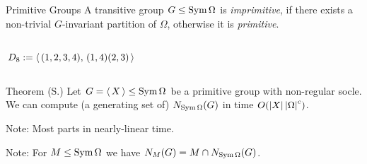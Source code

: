\documentclass{beamer}
\theoremstyle{plain}
\theoremstyle{definition}
\begin{document}
\begin{frame}{Primitive Groups}
A transitive group $G \leq \operatorname{Sym} \Omega$ is
\emph{imprimitive}, if there exists a non-trivial $G$-invariant partition of
$\Omega$,
otherwise it is \emph{primitive}.

\begin{columns}
\begin{column}{0.5\textwidth}
$D_8 :=  \left\langle \,  (1,2,3,4),\, (1,4)(2,3)  \, \right\rangle $
\\[1em]

\end{column}
\begin{column}{0.3\textwidth}
{
}
\end{column}
\end{columns}
\end{frame}

\begin{frame}%
\begin{block}{Theorem (S.)}
Let $G =  \left\langle \, X \, \right\rangle  \leq \operatorname{Sym} \Omega$ be a primitive group
with non-regular socle.
We can compute (a generating set of) $N_{\operatorname{Sym} \Omega}(G)$
in time $O( \left| X \right|   \left| \Omega \right|  ^ c)$.
\end{block}
\vspace{1em}
Note: Most parts in nearly-linear time.

\vspace{1em}
\pause
Note: For $M \leq \operatorname{Sym} \Omega$ we have
$N_{M}(G) = M \cap N_{\operatorname{Sym} \Omega}(G)$.
\end{frame}
\end{document}
